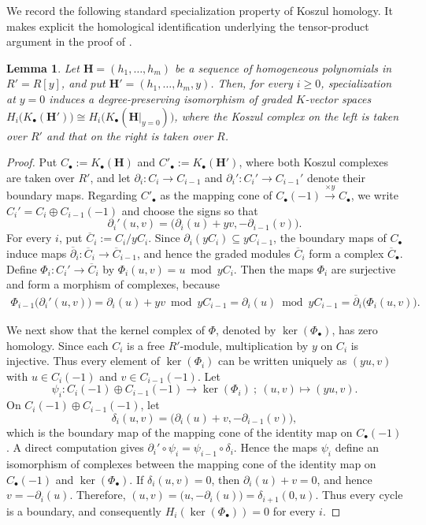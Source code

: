 \documentclass{article}
\newtheorem{lemma}[theorem]{Lemma}
\theoremstyle{definition}
\theoremstyle{plain}
\theoremstyle{plain}
\theoremstyle{plain}
\theoremstyle{plain}
\numberwithin{equation}{subsection}
\begin{document}
We record the following standard specialization property of Koszul homology.
It makes explicit the homological identification underlying the tensor-product argument in the proof of \cite[Theorem~7]{KY}.

\begin{lemma}\label{lem:koszul-specialization}
Let $\bm H=(h_1,\ldots,h_m)$ be a sequence of homogeneous polynomials in $R'=R[y]$, and put $\bm{H}'=(h_1,\ldots,h_m,y)$.
Then, for every $i\geq0$, specialization at $y=0$ induces a degree-preserving isomorphism of graded $K$-vector spaces $H_i\bigl(K_\bullet(\bm H')\bigr)\cong H_i\bigl(K_\bullet(\bm H|_{y=0})\bigr)$, where the Koszul complex on the left is taken over $R'$ and that on the right is taken over $R$.
\end{lemma}

\begin{proof}
Put $C_\bullet:=K_\bullet(\bm H)$ and $C'_\bullet:=K_\bullet(\bm H')$, where both Koszul complexes are taken over $R'$, and let $\partial_i:C_i\longrightarrow C_{i-1}$ and $\partial_i':C_i'\longrightarrow C_{i-1}'$ denote their boundary maps.
Regarding $C'_\bullet$ as the mapping cone of $C_\bullet(-1)\xrightarrow{\times y}C_\bullet$, we write $C_i'=C_i\oplus C_{i-1}(-1)$ and choose the signs so that
\[
\partial_i'(u,v)
=
\bigl(\partial_i(u)+yv,-\partial_{i-1}(v)\bigr).
\]
For every $i$, put $\overline C_i:=C_i/yC_i$.
Since $\partial_i(yC_i)\subseteq yC_{i-1}$, the boundary maps of
$C_\bullet$ induce maps $\overline\partial_i: \overline C_i\longrightarrow\overline C_{i-1}$, and hence the graded modules $\overline C_i$ form a complex $\overline C_\bullet$.
Define $\Phi_i:C_i'\longrightarrow\overline C_i$ by $\Phi_i(u,v)=u\bmod yC_i$.
Then the maps $\Phi_i$ are surjective and form a morphism of complexes, because
\[
\begin{aligned}
\Phi_{i-1}\bigl(\partial_i'(u,v)\bigr)=
\partial_i(u)+yv\bmod yC_{i-1}=
\partial_i(u)\bmod yC_{i-1}=
\overline\partial_i\bigl(\Phi_i(u,v)\bigr).
\end{aligned}
\]

We next show that the kernel complex of $\Phi$, denoted by $\ker(\Phi_\bullet)$, has zero homology.
Since each $C_i$ is a free $R'$-module, multiplication by $y$ on $C_i$ is injective.
Thus every element of $\ker(\Phi_i)$ can be written uniquely as $(yu,v)$ with $u\in C_i(-1)$ and $v\in C_{i-1}(-1)$.
Let
\[
\psi_i: C_i(-1)\oplus C_{i-1}(-1) \longrightarrow \ker(\Phi_i)
\ ;\ (u,v)\longmapsto(yu,v).
\]
On $C_i(-1)\oplus C_{i-1}(-1)$, let
\[
\delta_i(u,v) = \bigl(\partial_i(u)+v,-\partial_{i-1}(v)\bigr),
\]
which is the boundary map of the mapping cone of the identity map on $C_\bullet(-1)$.
A direct computation gives $\partial_i'\circ\psi_i=\psi_{i-1}\circ\delta_i$.
Hence the maps $\psi_i$ define an isomorphism of complexes between the mapping cone of the identity map on $C_\bullet(-1)$ and $\ker(\Phi_\bullet)$.
If $\delta_i(u,v)=0$, then $\partial_i(u)+v=0$, and hence $v=-\partial_i(u)$.
Therefore, $(u,v)=\bigl(u,-\partial_i(u)\bigr)=\delta_{i+1}(0,u)$.
Thus every cycle is a boundary, and consequently $H_i(\ker(\Phi_\bullet))=0$ for every $i$.


\end{proof}
\end{document}
